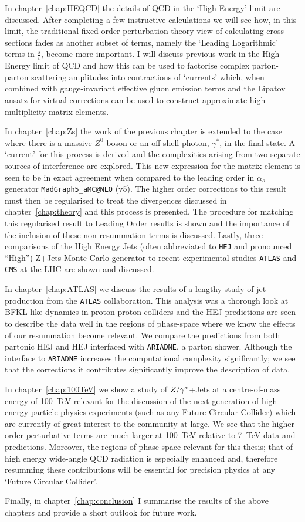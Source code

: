 	In chapter~\ref{chap:HEQCD} the details of QCD in the `High Energy' limit are discussed.  After completing a
	few instructive calculations we will see how, in this limit, the traditional fixed-order perturbation theory
	view of calculating cross-sections fades as another subset of terms, namely the `Leading Logarithmic' terms in
	$\frac{s}{t}$, become more important.  I will discuss previous work in the High Energy limit of QCD and how
	this can be used to factorise complex parton-parton scattering amplitudes into contractions of `currents' which,
	when combined with gauge-invariant effective gluon emission terms and the Lipatov ansatz for virtual corrections
	can be used to construct approximate high-multiplicity matrix elements.

	In chapter~\ref{chap:Zs} the work of the previous chapter is extended to the case where there is a massive
	$Z^0$ boson or an off-shell photon, $\gamma^*$, in the final state.  A `current' for this process is derived
	and the complexities arising from two separate sources of interference are explored.  This new expression for the
	matrix element is seen to be in exact agreement when compared to the leading order in $\alpha_s$ generator
	\texttt{MadGraph5\_aMC@NLO} (v5). The higher order corrections to this result must then be regularised to treat
	the divergences discussed in chapter~\ref{chap:theory} and this process is presented.  The procedure for matching this regularised result to Leading
	Order results is shown and the importance of the inclusion of these non-resummation terms is discussed. Lastly,
	three comparisons of the High Energy Jets (often abbreviated to \texttt{HEJ} and pronounced ``High'') Z+Jets
	Monte Carlo generator to recent experimental studies \texttt{ATLAS} and \texttt{CMS} at the LHC are shown and discussed.

	In chapter~\ref{chap:ATLAS} we discuss the results of a lengthy study of jet production from the \texttt{ATLAS}
	collaboration.  This analysis was a thorough look at BFKL-like dynamics in proton-proton colliders and the HEJ
	predictions are seen to describe the data well in the regions of phase-space where we know the effects of our
	resummation become relevant.  We compare the predictions from both partonic HEJ and HEJ interfaced with
	\texttt{ARIADNE}, a parton shower.  Although the interface to \texttt{ARIADNE}
	increases the computational complexity significantly; we see that the corrections it contributes significantly
	improve the description of data.

	In chapter~\ref{chap:100TeV} we show a study of $Z/\gamma^*$+Jets at a centre-of-mass energy of 100~TeV relevant for the
	discussion of the next generation of high energy particle physics experiments (such as any Future Circular Collider)
	which are currently of great interest to the community at large.  We see that the higher-order perturbative terms are
	much larger at 100~TeV relative to 7~TeV data and predictions.  Moreover, the regions of phase-space relevant
	for this thesis; that of high energy wide-angle QCD radiation is especially enhanced and, therefore resumming
	these contributions will be essential for precision physics at any `Future Circular Collider'.

	Finally, in chapter~\ref{chap:conclusion} I summarise the results of the above chapters and provide a short
	outlook for future work.

